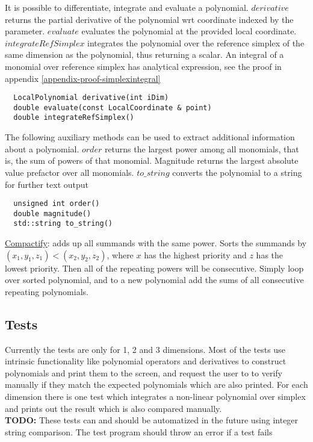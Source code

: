 \noindent
It is possible to differentiate, integrate and evaluate a polynomial. $derivative$ returns the partial derivative of the polynomial wrt coordinate indexed by the parameter. $evaluate$ evaluates the polynomial at the provided local coordinate. $integrateRefSimplex$ integrates the polynomial over the reference simplex of the same dimension as the polynomial, thus returning a scalar. An integral of a monomial over reference simplex has analytical expression, see the proof in appendix \ref{appendix-proof-simplexintegral}  \\


\begin{mybox}
\begin{lstlisting}
  LocalPolynomial derivative(int iDim)
  double evaluate(const LocalCoordinate & point)
  double integrateRefSimplex()
\end{lstlisting}
\end{mybox}


\noindent
The following auxiliary methods can be used to extract additional information about a polynomial. $order$ returns the largest power among all monomials, that is, the sum of powers of that monomial. Magnitude returns the largest absolute value prefactor over all monomials. $to\_string$ converts the polynomial to a string for further text output \\

\begin{mybox}
\begin{lstlisting}
  unsigned int order()
  double magnitude()
  std::string to_string()
\end{lstlisting}
\end{mybox}


\noindent
\uline{Compactify}: adds up all summands with the same power. Sorts the summands by $(x_1,y_1,z_1) < (x_2, y_2, z_2)$, where $x$ has the highest priority and $z$ has the lowest priority. Then all of the repeating powers will be consecutive. Simply loop over sorted polynomial, and to a new polynomial add the sums of all consecutive repeating polynomials.



\subsection{Tests}


\noindent
Currently the tests are only for 1, 2 and 3 dimensions. Most of the tests use intrinsic functionality like polynomial operators and derivatives to construct polynomials and print them to the screen, and request the user to to verify manually if they match the expected polynomials which are also printed. For each dimension there is one test which integrates a non-linear polynomial over simplex and prints out the result which is also compared manually. \\

\textbf{TODO:} These tests can and should be automatized in the future using integer string comparison. The test program should throw an error if a test fails